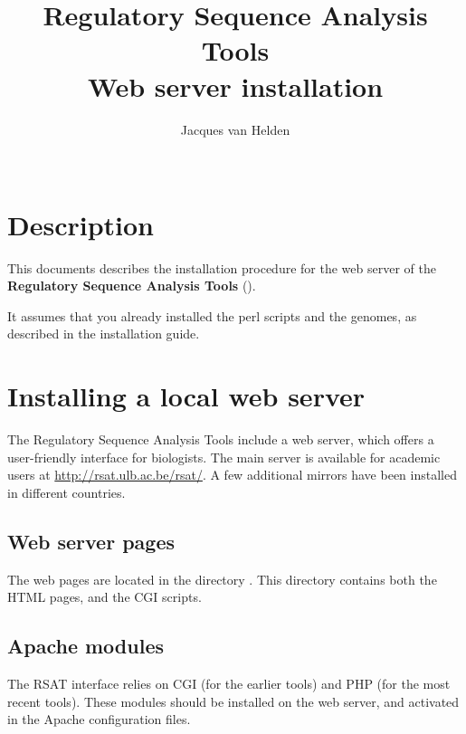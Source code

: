 \documentclass[12pt,a4paper, twoside]{scrreprt} %
\begin{document}
\title{Regulatory Sequence Analysis Tools \\
Web server installation}

\author{
	Jacques van Helden \\
	 \\
	\bigre 
}


\maketitle

\newpage
\tableofcontents
\newpage

\section{Description}

This documents describes the installation procedure for the web server
of the \textbf{Regulatory Sequence Analysis Tools} (\RSAT).

It assumes that you already installed the perl scripts and the
genomes, as described in the \RSAT installation guide.


\section{Installing a local web server}

The Regulatory Sequence Analysis Tools include a web server, which
offers a user-friendly interface for biologists. The main server is
available for academic users at \url{http://rsat.ulb.ac.be/rsat/}. A
few additional mirrors have been installed in different countries.

\subsection{Web server pages}

The web pages are located in the directory
. This directory contains both the HTML
pages, and the CGI scripts.

\subsection{Apache modules}

The RSAT interface relies on CGI (for the earlier tools) and PHP (for
the most recent tools). These modules should be installed on the web
server, and activated in the Apache configuration files. 
\end{document}
